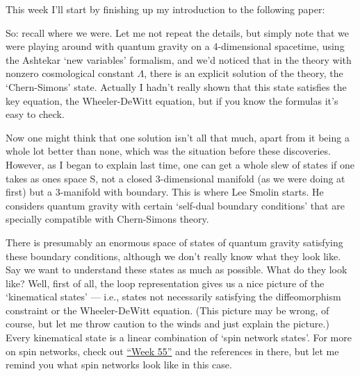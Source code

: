 \documentclass{article}
\def\tightlist{}
\renewcommand{\texttt}[1]{%
  \begingroup
  \ttfamily
  \begingroup\lccode`~=`/\lowercase{\endgroup\def~}{/\discretionary{}{}{}}%
  \begingroup\lccode`~=`[\lowercase{\endgroup\def~}{[\discretionary{}{}{}}%
  \begingroup\lccode`~=`.\lowercase{\endgroup\def~}{.\discretionary{}{}{}}%
  \catcode`/=\active\catcode`[=\active\catcode`.=\active
  \scantokens{#1\noexpand}%
  \endgroup
}
\begin{document}
This week I'll start by finishing up my introduction to the following
paper:


So: recall where we were. Let me not repeat the details, but simply note
that we were playing around with quantum gravity on a 4-dimensional
spacetime, using the Ashtekar `new variables' formalism, and we'd
noticed that in the theory with nonzero cosmological constant
\(\Lambda\), there is an explicit solution of the theory, the
`Chern-Simons' state. Actually I hadn't really shown that this state
satisfies the key equation, the Wheeler-DeWitt equation, but if you know
the formulas it's easy to check.

Now one might think that one solution isn't all that much, apart from it
being a whole lot better than none, which was the situation before these
discoveries. However, as I began to explain last time, one can get a
whole slew of states if one takes as ones space S, not a closed
3-dimensional manifold (as we were doing at first) but a 3-manifold with
boundary. This is where Lee Smolin starts. He considers quantum gravity
with certain `self-dual boundary conditions' that are specially
compatible with Chern-Simons theory.

There is presumably an enormous space of states of quantum gravity
satisfying these boundary conditions, although we don't really know what
they look like. Say we want to understand these states as much as
possible. What do they look like? Well, first of all, the loop
representation gives us a nice picture of the `kinematical states' ---
i.e., states not necessarily satisfying the diffeomorphism constraint or
the Wheeler-DeWitt equation. (This picture may be wrong, of course, but
let me throw caution to the winds and just explain the picture.) Every
kinematical state is a linear combination of `spin network states'. For
more on spin networks, check out \protect\hyperlink{week55}{``Week 55''}
and the references in there, but let me remind you what spin networks
look like in this case.
\end{document}
